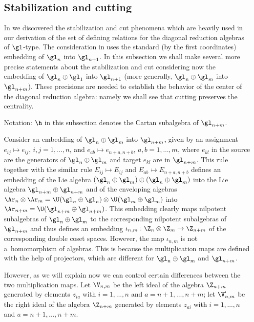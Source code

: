 \documentclass[pdftex]{sigma}
\def\nplus{\mathfrak{n}}\def\nn{\nonumber}\def\nin{\noindent}
\def\s{z}\def\S{\mathrm {S}}\def\si{\sigma}\def\Sp{\S^{\nplus}}\def\sy{\acute{\sigma}}\def\th{\mathring{h}}
\numberwithin{equation}{section}
\begin{document}
\subsection{Stabilization and cutting} \label{subsection3.4}

In \cite{KO3} we discovered the stabilization and cut phenomena which are heavily used in our derivation of the set of def\/ining relations for the
diagonal reduction algebras of $\gl$-type. The consideration in \cite{KO3} uses the standard (by the f\/irst coordinates) embedding of $\gl_n$ into $\gl_{n+1}$.
In this subsection we shall make several more precise statements about the stabilization and cut considering now the embedding of $\gl_n\oplus\gl_1$
into $\gl_{n+1}$ (more generally, $\gl_n\oplus\gl_m$ into $\gl_{n+m}$). These precisions are needed to establish the behavior of the center of
the diagonal reduction algebra: namely we shall see that cutting preserves the centrality.


Notation: $\h$ in this subsection denotes the Cartan subalgebra of $\gl_{n+m}$.


Consider an embedding of $\gl_n\oplus \gl_m$ into $\gl_{n+m}$, given by an assignment $e_{ij}\mapsto e_{ij}$, $i,j=1,\ldots,n$, and
$e_{ab}\mapsto e_{n+a,n+b}$, $a,b=1,\ldots,m$, where $e_{kl}$ in the source are the generators of $\gl_n\oplus \gl_m$ and target $e_{kl}$
are in $\gl_{n+m}$. This rule together with the similar rule $E_{ij}\mapsto E_{ij}$ and $E_{ab}\mapsto E_{n+a,n+b}$ def\/ines an embedding of the Lie
algebra $(\gl_n\oplus \gl_m)\oplus(\gl_n\oplus \gl_m)$ into the Lie algebra $\gl_{n+m}\oplus\gl_{n+m}$ and of the enveloping algebras
$\Ar_n\otimes \Ar_m=\U(\gl_n\oplus\gl_n)\otimes \U(\gl_m\oplus\gl_m)$ into $\Ar_{n+m}=\U(\gl_{n+m}\oplus\gl_{n+m})$. This embedding clearly
maps nilpotent subalgebras of $\gl_n\oplus \gl_m$ to the corresponding nilpotent subalgebras of $\gl_{n+m}$ and thus def\/ines an embedding
$\iota_{n,m}:\Z_n\otimes\Z_m\to \Z_{n+m}$ of the corresponding double coset spaces. However, the map $\iota_{n,m}$ is not a~homomorphism of
algebras. This is because the multiplication maps are def\/ined with the help of projectors, which are dif\/ferent for $\gl_n\oplus \gl_m$ and $\gl_{n+m}$.


However, as we will explain now we can control certain dif\/ferences between the two multiplication maps. Let $\V_{n,m}$ be the left ideal of the
algebra $\Z_{n+m}$ generated by elements $\s_{ia}$ with $i=1,\ldots,n$ and $a=n+1,\ldots, n+m$; let  $\V_{n,m}'$ be the right ideal of the
algebra $\Z_{n+m}$ generated by elements $\s_{ai}$ with $i=1,\ldots, n$ and $a=n+1,\ldots, n+m$.
\end{document}
